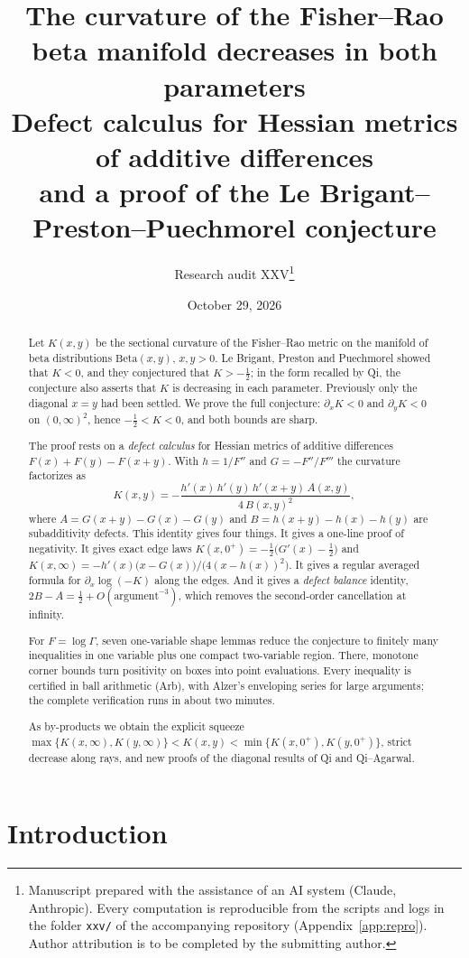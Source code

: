 \documentclass[11pt,a4paper]{article}
\title{The curvature of the Fisher--Rao beta manifold decreases in both parameters\\[4pt]
\large Defect calculus for Hessian metrics of additive differences\\ and a proof of the Le Brigant--Preston--Puechmorel conjecture}
\author{Research audit XXV\thanks{Manuscript prepared with the assistance of an AI system (Claude, Anthropic). Every computation is reproducible from the scripts and logs in the folder \texttt{xxv/} of the accompanying repository (Appendix~\ref{app:repro}). Author attribution is to be completed by the submitting author.}}
\date{October 29, 2026}
\theoremstyle{definition}
\theoremstyle{remark}
\begin{document}
\maketitle

\begin{abstract}
Let $K(x,y)$ be the sectional curvature of the Fisher--Rao metric on the manifold of beta distributions $\mathrm{Beta}(x,y)$, $x,y>0$. Le Brigant, Preston and Puechmorel showed that $K<0$, and they conjectured that $K>-\tfrac12$; in the form recalled by Qi, the conjecture also asserts that $K$ is decreasing in each parameter. Previously only the diagonal $x=y$ had been settled. We prove the full conjecture: $\partial_xK<0$ and $\partial_yK<0$ on $(0,\infty)^2$, hence $-\tfrac12<K<0$, and both bounds are sharp.

The proof rests on a \emph{defect calculus} for Hessian metrics of additive differences $F(x)+F(y)-F(x+y)$. With $h=1/F''$ and $G=-F''/F'''$ the curvature factorizes as
\[
K(x,y)=-\frac{h'(x)\,h'(y)\,h'(x+y)\,A(x,y)}{4\,B(x,y)^2},
\]
where $A=G(x+y)-G(x)-G(y)$ and $B=h(x+y)-h(x)-h(y)$ are subadditivity defects.
This identity gives four things. It gives a one-line proof of negativity. It gives exact edge laws $K(x,0^+)=-\tfrac12\bigl(G'(x)-\tfrac12\bigr)$ and $K(x,\infty)=-h'(x)\bigl(x-G(x)\bigr)/\bigl(4(x-h(x))^2\bigr)$. It gives a regular averaged formula for $\partial_x\log(-K)$ along the edges. And it gives a \emph{defect balance} identity, $2B-A=\tfrac12+O(\text{argument}^{-3})$, which removes the second-order cancellation at infinity.

For $F=\log\Gamma$, seven one-variable shape lemmas reduce the conjecture to finitely many inequalities in one variable plus one compact two-variable region. There, monotone corner bounds turn positivity on boxes into point evaluations. Every inequality is certified in ball arithmetic (Arb), with Alzer's enveloping series for large arguments; the complete verification runs in about two minutes.

As by-products we obtain the explicit squeeze $\max\{K(x,\infty),K(y,\infty)\}<K(x,y)<\min\{K(x,0^+),K(y,0^+)\}$, strict decrease along rays, and new proofs of the diagonal results of Qi and Qi--Agarwal.
\end{abstract}

\tableofcontents

\section{Introduction}\label{sec:intro}
\end{document}
